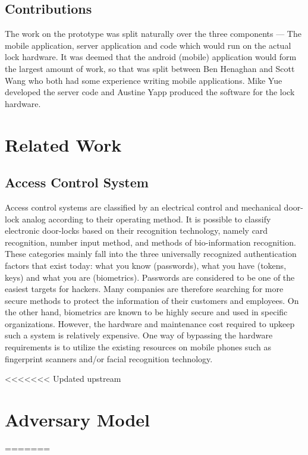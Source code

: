\documentclass[conference]{IEEEtran}
\begin{document}
\subsection{Contributions}
The work on the prototype was split naturally over the three components --- The mobile application, server application and code which would run on the actual lock hardware.
It was deemed that the android (mobile) application would form the largest amount of work, so that was split between Ben Henaghan and Scott Wang who both had some experience writing mobile applications.
Mike Yue developed the server code and Austine Yapp produced the software for the lock hardware.

\section{Related Work}
\subsection{Access Control System}
	Access control systems are classified by an electrical control and mechanical door-lock analog according to their operating method. It is possible to classify electronic door-locks based on their recognition technology, namely card recognition, number input method, and methods of bio-information recognition. These categories mainly fall into the three universally recognized authentication factors that exist today: what you know (passwords), what you have (tokens, keys) and what you are (biometrics). 
Passwords are considered to be one of the easiest targets for hackers. Many companies are therefore searching for more secure methods to protect the information of their customers and employees. On the other hand, biometrics are known to be highly secure and used in specific organizations. However, the hardware and maintenance cost required to upkeep such a system is relatively expensive. One way of bypassing the hardware requirements is to utilize the existing resources on mobile phones such as fingerprint scanners and/or facial recognition technology.

<<<<<<< Updated upstream
\section{Adversary Model}
=======
\end{document}
